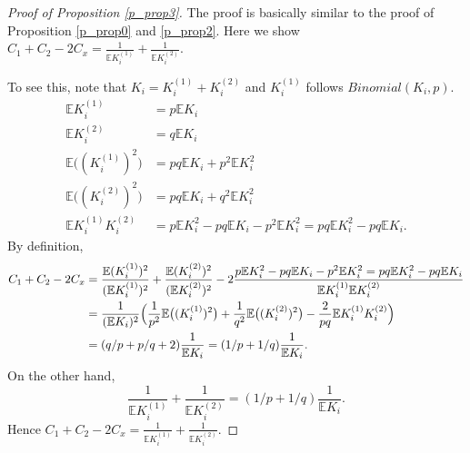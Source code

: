 \documentclass[12pt,letterpaper]{article}
\newcommand{\bbe}{\mathbb{E}}
\begin{document}
\begin{proof}[Proof of Proposition \ref{p_prop3}]
The proof is basically similar to the proof of Proposition \ref{p_prop0} and \ref{p_prop2}. Here we show  $C_1+C_2-2C_x = \frac{1 }{\bbe K_i^{(1)}}+\frac{1}{\bbe K_i^{(2)}}$. 

To see this, note that $K_i = K_i^{(1)}+K_i^{(2)}$ and $K_i^{(1)}$ follows $Binomial(K_i, p)$. 
\begin{align*}
\bbe K_i^{(1)} &= p\bbe K_i\\
\bbe K_i^{(2)} &=q\bbe K_i\\
\bbe \bigl((K_i^{(1)})^2\bigr)& = pq \bbe K_i + p^2 \bbe K_i^2\\
\bbe \bigl((K_i^{(2)})^2\bigr)& = pq \bbe K_i + q^2 \bbe K_i^2\\
\bbe K_i^{(1)}K_i^{(2)}& = p \bbe K_i^2 - pq \bbe K_i - p^2 \bbe K_i^2 = pq \bbe K_i^2 -pq \bbe K_i.
\end{align*}
By definition, 
\begin{align*}
C_1+C_2-2C_x &= \frac{\bbe (K_i^{(1)})^2}{(\bbe K_i^{(1)})^2} + \frac{\bbe (K_i^{(2)})^2}{(\bbe K_i^{(2)})^2} - 2 \frac{ p \bbe K_i^2 - pq \bbe K_i - p^2 \bbe K_i^2 = pq \bbe K_i^2 -pq \bbe K_i}{\bbe K_i^{(1)}\bbe K_i^{(2)}}\\
&= \frac{1}{(\bbe K_i)^2}\Bigl(\frac{1}{p^2 }\bbe \bigl((K_i^{(1)})^2\bigr)+\frac{1}{q^2}\bbe \bigl((K_i^{(2)})^2\bigr) - \frac{2}{pq}\bbe K_i^{(1)}K_i^{(2)} \Bigr)\\
& = (q/p + p/q +2) \frac{1}{\bbe K_i} = (1/p+1/q)\frac{1}{\bbe K_i}.
\end{align*}
On the other hand,
\[
\frac{1 }{\bbe K_i^{(1)}}+\frac{1}{\bbe K_i^{(2)}} = (1/p+1/q)\frac{1}{\bbe K_i}. 
\]
Hence $C_1+C_2-2C_x = \frac{1 }{\bbe K_i^{(1)}}+\frac{1}{\bbe K_i^{(2)}}$.
\end{proof}
\end{document}
